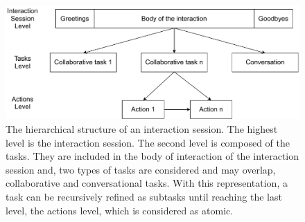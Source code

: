 \documentclass[a4paper,11pt,twoside]{StyleThese}
\begin{document}

\begin{figure}[!ht]
	\centering
	\includegraphics[width=\linewidth]{figures/chapter2/session_interaction.pdf}
	\caption{The hierarchical structure of an interaction session. The highest level is the interaction session. The second level is composed of the tasks. They are included in the body of interaction of the interaction session and, two types of tasks are considered and may overlap, collaborative and conversational tasks. With this representation, a task can be recursively refined as subtasks until reaching the last level, the actions level, which is considered as atomic.
		}
	\label{fig:levels}
\end{figure}
\end{document}
